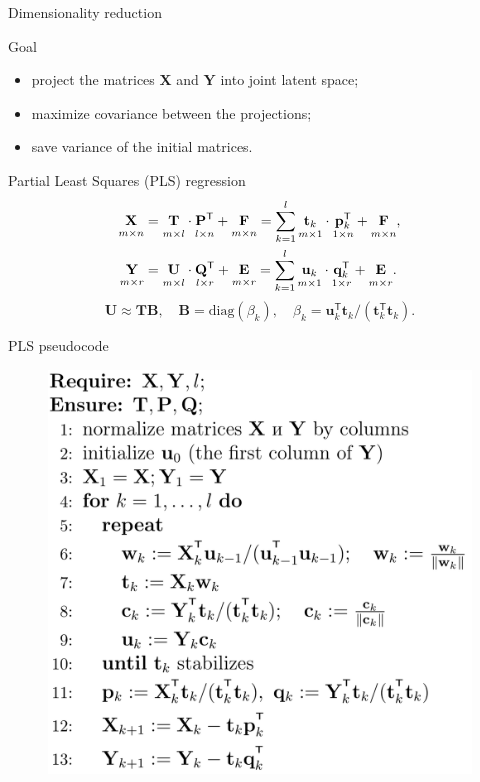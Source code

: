 \documentclass[9pt]{beamer}
\newcommand{\bY}{\mathbf{Y}}
\newcommand{\bX}{\mathbf{X}}
\newcommand{\bu}{\mathbf{u}}
\newcommand{\bt}{\mathbf{t}}
\newcommand{\bp}{\mathbf{p}}
\newcommand{\bq}{\mathbf{q}}
\newcommand{\bP}{\mathbf{P}}
\newcommand{\bT}{\mathbf{T}}
\newcommand{\bB}{\mathbf{B}}
\newcommand{\bQ}{\mathbf{Q}}
\newcommand{\bE}{\mathbf{E}}
\newcommand{\bF}{\mathbf{F}}
\newcommand{\bU}{\mathbf{U}}
\newcommand{\T}{\mathsf{T}}
\begin{document}
\begin{frame}{Dimensionality reduction}
\begin{block}{Goal}
	\begin{itemize}
		\item project the matrices $\bX$ and $\bY$ into joint latent space;
		\item maximize covariance between the projections;
		\item save variance of the initial matrices.
	\end{itemize}
\end{block}


\begin{block}{Partial Least Squares (PLS) regression}
	\vspace{-0.5cm}
	\begin{align*}
	\underset{m \times n}{\vphantom{\bQ}\bX} 
	&= \underset{m \times l}{\vphantom{\bQ}\bT} \cdot \underset{l \times n}{\vphantom{\bQ}\bP^{\T}} + \underset{m \times n}{\vphantom{\bQ}\bF} 
	= \sum_{k=1}^l \underset{m \times 1}{\vphantom{\bp_k^{\T}}\bt_k} \cdot \underset{1 \times n}{\bp_k^{\T}} + \underset{m \times n}{\vphantom{\bp_k^{\T}}\bF},\\
	\underset{m \times r}{\vphantom{\bQ}\bY} 
	&= \underset{m \times l}{\vphantom{\bQ}\bU} \cdot \underset{l \times r}{\bQ^{\T}} + \underset{m \times r}{\vphantom{\bQ}\bE}
	=  \sum_{k=1}^l  \underset{m \times 1}{\vphantom{\bq_k^{\T}}\bu_k} \cdot \underset{1 \times r}{\bq_k^{\T}} +  \underset{m \times r}{\vphantom{\bq_k^{\T}}\bE}.
	\end{align*}
	\begin{equation*}
	\bU \approx \bT \bB, \quad \bB = \text{diag}(\beta_k), \quad \beta_k = \bu_k^{\T}\bt_k / (\bt_k^{\T}\bt_k).
	\end{equation*}
\end{block}

\end{frame}
\begin{frame}{PLS pseudocode}

\begin{figure}
\begin{flushleft}
	\includegraphics[width=0.6\linewidth]{figs/pls_pseudocode}
\end{flushleft}
\end{figure}
\end{frame}
\end{document}
